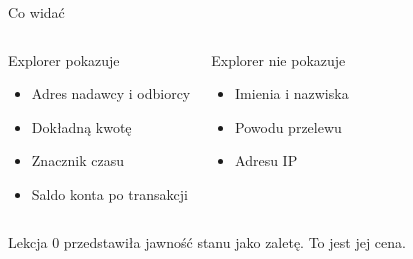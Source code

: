 \begin{frame}{Co widać}
  \addtocounter{beamerpauses}{-3}%
  \begin{columns}[T]
      \begin{block}{Explorer pokazuje}
        \begin{itemize}
          \item Adres nadawcy i odbiorcy
          \item Dokładną kwotę
          \item Znacznik czasu
          \item Saldo konta po transakcji
        \end{itemize}
      \end{block}

      \begin{alertblock}{Explorer nie pokazuje}
        \begin{itemize}
          \item Imienia i nazwiska
          \item Powodu przelewu
          \item Adresu IP
        \end{itemize}
      \end{alertblock}
  \end{columns}
  \vspace{0.4cm}
  \begin{center}
    \textcolor{stplmuted}{\small Lekcja 0 przedstawiła jawność stanu jako zaletę. To jest jej cena.}
  \end{center}
\end{frame}

